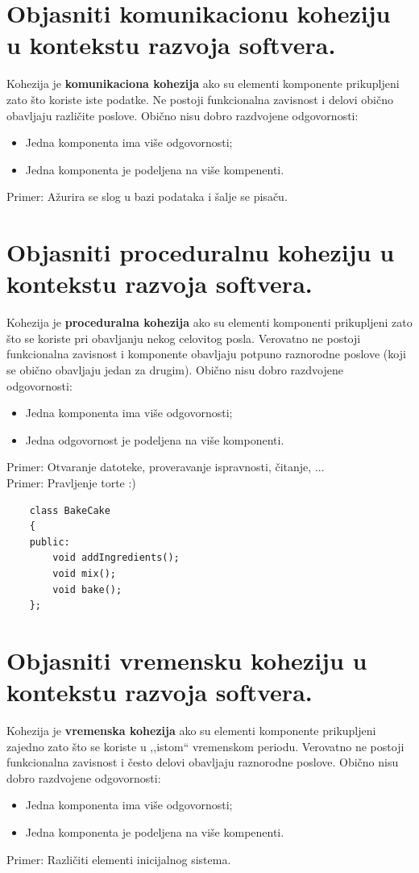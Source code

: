 \documentclass[a4paper]{article}
\begin{document}
\section{Objasniti komunikacionu koheziju u kontekstu razvoja softvera.}
  Kohezija je \textbf{komunikaciona kohezija} ako su elementi komponente prikupljeni 
  zato što koriste iste podatke. Ne postoji funkcionalna zavisnost i delovi obično obavljaju
  različite poslove. Obično nisu dobro razdvojene odgovornosti: 
  \begin{itemize}
    \item Jedna komponenta ima više odgovornosti;
    \item Jedna komponenta je podeljena na više kompenenti.
  \end{itemize}
  Primer: Ažurira se slog u bazi podataka i šalje se pisaču.

\section{Objasniti proceduralnu koheziju u kontekstu razvoja softvera.}
  Kohezija je \textbf{proceduralna kohezija} ako su elementi komponenti prikupljeni zato što
  se koriste pri obavljanju nekog celovitog posla. Verovatno ne postoji funkcionalna
  zavisnost i komponente obavljaju potpuno raznorodne poslove (koji se obično obavljaju
  jedan za drugim). Obično nisu dobro razdvojene odgovornosti:
  \begin{itemize}
    \item Jedna komponenta ima više odgovornosti;
    \item Jedna odgovornost je podeljena na više komponenti.
  \end{itemize}
  Primer: Otvaranje datoteke, proveravanje ispravnosti, čitanje, ...\\
  Primer: Pravljenje torte :)

  \begin{lstlisting}
    class BakeCake
    {
    public:
        void addIngredients();
        void mix();
        void bake();
    };\end{lstlisting}

\section{Objasniti vremensku koheziju u kontekstu razvoja softvera.}
  Kohezija je \textbf{vremenska kohezija} ako su elementi komponente prikupljeni zajedno 
  zato što se koriste u ,,istom`` vremenskom periodu. Verovatno ne postoji funkcionalna zavisnost i
  često delovi obavljaju raznorodne poslove. Obično nisu dobro razdvojene odgovornosti: 
  \begin{itemize}
    \item Jedna komponenta ima više odgovornosti;
    \item Jedna komponenta je podeljena na više kompenenti.
  \end{itemize}
  Primer: Različiti elementi inicijalnog sistema. 
\end{document}

